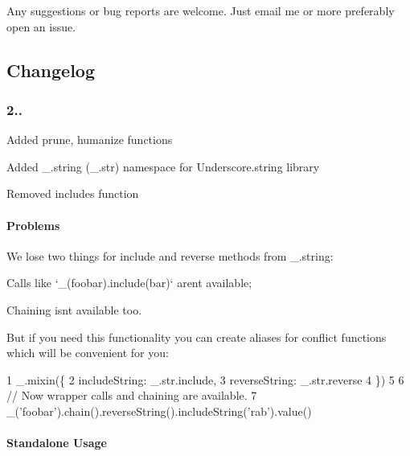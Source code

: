 Any suggestions or bug reports are welcome. Just email me or more preferably open an issue.

\subsection*{Changelog}

\subsubsection*{2..}


\begin{DoxyItemize}
\item Added prune, humanize functions
\item Added \+\_\+.\+string (\+\_\+.\+str) namespace for Underscore.\+string library
\item Removed includes function
\end{DoxyItemize}

\paragraph*{Problems}

We lose two things for {\ttfamily include} and {\ttfamily reverse} methods from {\ttfamily \+\_\+.\+string}\+:


\begin{DoxyItemize}
\item Calls like `\+\_\+(\textquotesingle{}foobar\textquotesingle{}).include(\textquotesingle{}bar\textquotesingle{})` aren\textquotesingle{}t available;
\item Chaining isn\textquotesingle{}t available too.
\end{DoxyItemize}

But if you need this functionality you can create aliases for conflict functions which will be convenient for you\+:


\begin{DoxyCode}
1 \_.mixin(\{
2     includeString: \_.str.include,
3     reverseString: \_.str.reverse
4 \})
5 
6 // Now wrapper calls and chaining are available.
7 \_('foobar').chain().reverseString().includeString('rab').value()
\end{DoxyCode}


\paragraph*{Standalone Usage}

